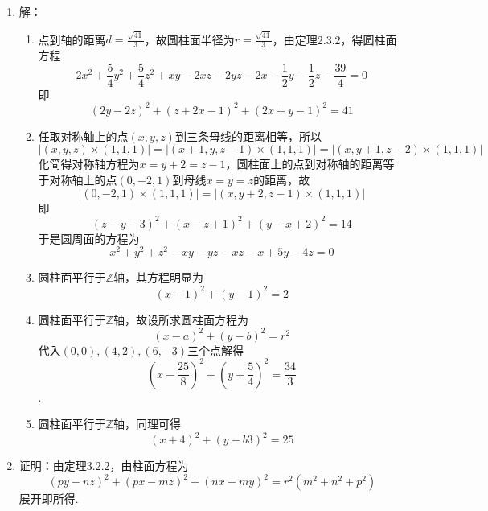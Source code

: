 \documentclass[UTF8]{ctexart}
\begin{document}
\begin{enumerate}
\item 解：\begin{enumerate}[(1)]
\item 点到轴的距离$d=\displaystyle\frac{\sqrt{41}}{3}$，故圆柱面半径为$r=\displaystyle\frac{\sqrt{41}}{3}$，由定理2.3.2，得圆柱面方程$$2x^2+\displaystyle\frac{5}{4}y^2+\displaystyle\frac{5}{4}z^2+xy-2xz-2yz-2x-\displaystyle\frac{1}{2}y-\displaystyle\frac{1}{2}z-\displaystyle\frac{39}{4}=0$$即$$\left(2y-2z\right)^2+\left(z+2x-1\right)^2+\left(2x+y-1\right)^2=41$$
\item 任取对称轴上的点$\left(x,y,z\right)$到三条母线的距离相等，所以$$\left|\left(x,y,z\right)\times\left(1,1,1\right)\right|=\left|\left(x+1,y,z-1\right)\times\left(1,1,1\right)\right|=\left|\left(x,y+1,z-2\right)\times\left(1,1,1\right)\right|$$化简得对称轴方程为$x=y+2=z-1$，圆柱面上的点到对称轴的距离等于对称轴上的点$\left(0,-2,1\right)$到母线$x=y=z$的距离，故$$\left|\left(0,-2,1\right)\times\left(1,1,1\right)\right|=\left|\left(x,y+2,z-1\right)\times\left(1,1,1\right)\right|$$即$$\left(z-y-3\right)^2+\left(x-z+1\right)^2+\left(y-x+2\right)^2=14$$于是圆周面的方程为$$x^2+y^2+z^2-xy-yz-xz-x+5y-4z=0$$
\item 圆柱面平行于$\mathbb{Z}$轴，其方程明显为$$\left(x-1\right)^2+\left(y-1\right)^2=2$$
\item 圆柱面平行于$\mathbb{Z}$轴，故设所求圆柱面方程为$$\left(x-a\right)^2+\left(y-b\right)^2=r^2$$代入$\left(0,0\right),\left(4,2\right),\left(6,-3\right)$三个点解得$$\left(x-\displaystyle\frac{25}{8}\right)^2+\left(y+\displaystyle\frac{5}{4}\right)^2=\displaystyle\frac{34}{3}$$.
\item 圆柱面平行于$\mathbb{Z}$轴，同理可得$$\left(x+4\right)^2+\left(y-b3\right)^2=25$$
\end{enumerate}
\item 证明：由定理3.2.2，由柱面方程为$$\left(py-nz\right)^2+\left(px-mz\right)^2+\left(nx-my\right)^2=r^2\left(m^2+n^2+p^2\right)$$展开即所得. 
\end{enumerate}
\end{document}
